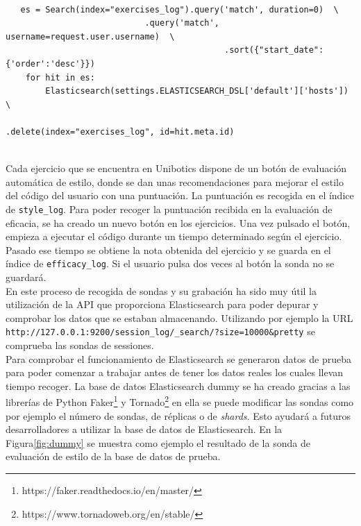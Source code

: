\\
{\footnotesize
\begin{verbatim}
   es = Search(index="exercises_log").query('match', duration=0)  \
   				            .query('match', username=request.user.username)  \
        					                .sort({"start_date": {'order':'desc'}})
    for hit in es:
        Elasticsearch(settings.ELASTICSEARCH_DSL['default']['hosts'])  \ 
    				                        .delete(index="exercises_log", id=hit.meta.id)
\end{verbatim}
}
\\
Cada ejercicio que se encuentra en Unibotics dispone de un botón de evaluación automática de estilo, donde se dan unas recomendaciones para mejorar el estilo del código del usuario con una puntuación. La puntuación es recogida en el índice de \texttt{style\_log}. Para poder recoger la puntuación recibida en la evaluación de eficacia, se ha creado un nuevo botón en los ejercicios. Una vez pulsado el botón, empieza a ejecutar el código durante un tiempo determinado según el ejercicio. Pasado ese tiempo se obtiene la nota obtenida del ejercicio y se guarda en el índice de \texttt{efficacy\_log}. Si el usuario pulsa dos veces al botón la sonda no se guardará.\\


En este proceso de recogida de sondas y su grabación ha sido muy útil la utilización de la API que proporciona Elasticsearch para poder depurar y comprobar los datos que se estaban almacenando. Utilizando por ejemplo la URL \texttt{http://127.0.0.1:9200/session\_log/\_search/?size=10000&pretty} se comprueba las sondas de sessiones.\\

Para comprobar el funcionamiento de Elasticsearch se generaron datos de prueba para poder comenzar a trabajar antes de tener los datos reales los cuales llevan tiempo recoger. La base de datos Elasticsearch dummy se ha creado gracias a las librerías de Python Faker\footnote{https://faker.readthedocs.io/en/master/} y Tornado\footnote{https://www.tornadoweb.org/en/stable/} en ella se puede modificar las sondas como por ejemplo el número de sondas, de réplicas o de \textit{shards}. Esto ayudará a futuros desarrolladores a utilizar la base de datos de Elasticsearch. En la Figura\ref{fig:dummy} se muestra como ejemplo el resultado de la sonda de evaluación de estilo de la base de datos de prueba.


